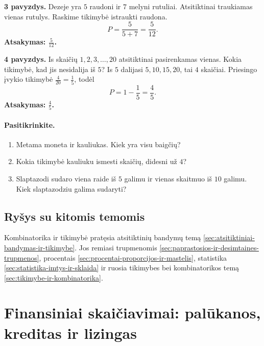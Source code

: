 \textbf{3 pavyzdys.} Dezeje yra $5$ raudoni ir $7$ melyni rutuliai. Atsitiktinai traukiamas vienas rutulys. Raskime tikimybė istraukti raudona.
\[
P=\frac{5}{5+7}=\frac5{12}.
\]
\textbf{Atsakymas: $\frac5{12}$.}

\textbf{4 pavyzdys.} Is skaičių $1,2,3,\ldots,20$ atsitiktinai pasirenkamas vienas. Kokia tikimybė, kad jis nesidalija iš $5$?
Is $5$ dalijasi $5,10,15,20$, tai $4$ skaičiai. Priesingo įvykio tikimybė $\frac4{20}=\frac15$, todėl
\[
P=1-\frac15=\frac45.
\]
\textbf{Atsakymas: $\frac45$.}

\paragraph{Pasitikrinkite.}
\begin{enumerate}[label=\alph*)]
\item Metama moneta ir kauliukas. Kiek yra visu baigčių?
\item Kokia tikimybė kauliuku ismesti skaičių, didesni už $4$?
\item Slaptazodi sudaro viena raide iš $5$ galimu ir vienas skaitmuo iš $10$ galimu. Kiek slaptazodziu galima sudaryti?
\end{enumerate}

\subsection{Ryšys su kitomis temomis}
Kombinatorika ir tikimybė pratęsia atsitiktinių bandymų temą \ref{sec:atsitiktiniai-bandymas-ir-tikimybe}. Jos remiasi trupmenomis \ref{sec:paprastosios-ir-desimtaines-trupmenos}, procentais \ref{sec:procentai-proporcijos-ir-mastelis}, statistika \ref{sec:statistika-imtys-ir-sklaida} ir ruosia tikimybes bei kombinatorikos temą \ref{sec:tikimybe-ir-kombinatorika}.

\section{Finansiniai skaičiavimai: palūkanos, kreditas ir lizingas}\label{sec:finansiniai-skaiciavimai-palukanos-kreditas-lizingas}

